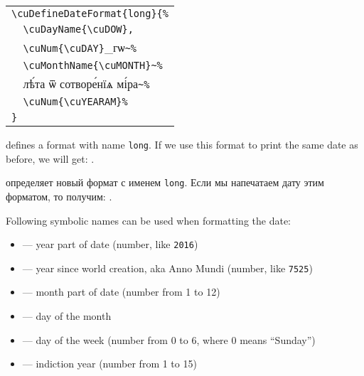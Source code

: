 \begin{center}
\begin{churchslavonic}
\begin{tabular}{l}
\verb+\cuDefineDateFormat{long}{%+\\
\verb+  \cuDayName{\cuDOW},+\\
\verb+  \cuNum{\cuDAY}+_гѡ\verb+~%+\\
\verb+  \cuMonthName{\cuMONTH}~%+\\
\verb+  +лѣ́та ѿ сотворе́нїѧ мі́ра\verb+~%+\\
\verb+  \cuNum{\cuYEARAM}%+\\
\verb+}+\\
\end{tabular}
\end{churchslavonic}
\end{center}
%
\begin{EN}
defines a format with name \texttt{long}. If we use this format to print the same date as before, we will get:
.
\end{EN}
%
\begin{RU}
определяет новый формат с именем \texttt{long}. Если мы напечатаем дату этим форматом, то получим:
.
\end{RU}

\begin{EN}
Following symbolic names can be used when formatting the date:
\begin{itemize}
\item {} --- year part of date (number, like \texttt{2016})
\item {}\footnotemark[1] --- year since world creation, aka Anno Mundi (number, like \texttt{7525})
\item {} --- month part of date (number from 1 to 12)
\item {} --- day of the month
\item {}\footnotemark[1] --- day of the week (number from 0 to 6, where 0 means ``Sunday'')
\item {} --- indiction year (number from 1 to 15)
\end{itemize}
\end{EN}

